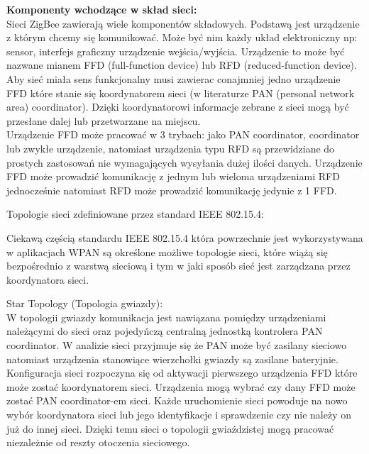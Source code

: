 \par \tab \textbf{Komponenty wchodzące w skład sieci:}\\ 
\tab Sieci ZigBee zawierają wiele  komponentów składowych. Podstawą jest urządzenie z którym chcemy się komunikować. Może być nim każdy układ elektroniczny np: sensor, interfejs graficzny urządzenie wejścia/wyjścia. Urządzenie to może być nazwane mianem FFD (full-function device) lub RFD (reduced-function device). Aby sieć miała sens funkcjonalny musi zawierac conajmniej jedno urządzenie FFD które stanie się koordynatorem sieci (w literaturze PAN (personal network area) coordinator). Dzięki koordynatorowi informacje zebrane z sieci mogą być przesłane dalej lub przetwarzane na miejscu. \\
\tab		Urządzenie FFD może pracować w 3 trybach: jako PAN coordinator, coordinator lub zwykłe urządzenie, natomiast urządzenia typu RFD są przewidziane do prostych zastosowań nie wymagających wysyłania dużej ilości danych. Urządzenie FFD może prowadzić komunikację z jednym lub wieloma urządzeniami RFD jednocześnie natomiast RFD może prowadzić komunikację jedynie z 1 FFD.
\\		
\begin{center}
Topologie sieci zdefiniowane przez standard IEEE 802.15.4: \\
\end{center}
Ciekawą częścią standardu IEEE 802.15.4 która powrzechnie jest wykorzystywana w aplikacjach WPAN są określone możliwe topologie sieci, które wiążą się bezpośrednio z warstwą sieciową i tym w jaki sposób sieć jest zarządzana przez koordynatora sieci.
\par 
Star Topology (Topologia gwiazdy):\\ 
\tab 	W topologii gwiazdy komunikacja jest nawiązana pomiędzy urządzeniami należącymi do sieci oraz pojedyńczą centralną jednostką kontrolera PAN coordinator. W analizie sieci przyjmuje się że PAN może być zasilany sieciowo natomiast urządzenia stanowiące wierzchołki gwiazdy są zasilane bateryjnie. \\
\tab 	Konfiguracja sieci rozpoczyna się od aktywacji pierwszego urządzenia FFD które może zostać koordynatorem sieci. Urządzenia mogą wybrać czy dany FFD może zostać  PAN coordinator-em sieci. Każde uruchomienie sieci powoduje na nowo wybór koordynatora sieci lub jego identyfikacje i sprawdzenie czy nie należy on już do innej sieci. Dzięki temu sieci o topologii gwiaździstej mogą pracować niezależnie od reszty otoczenia sieciowego.\\

